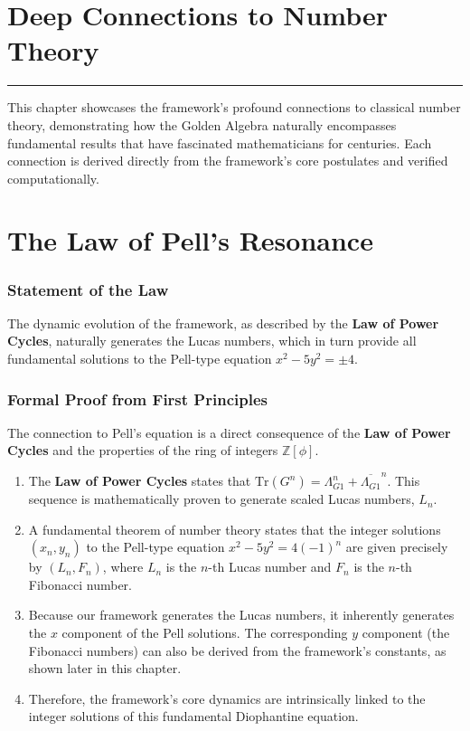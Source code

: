 
\section{Deep Connections to Number Theory}
\label{chap:number_theory}

\hrule
\vspace{1em}
This chapter showcases the framework's profound connections to classical number theory, demonstrating how the Golden Algebra naturally encompasses fundamental results that have fascinated mathematicians for centuries. Each connection is derived directly from the framework's core postulates and verified computationally.

\section{The Law of Pell's Resonance}

\subsubsection*{Statement of the Law}
The dynamic evolution of the framework, as described by the \textbf{Law of Power Cycles}, naturally generates the Lucas numbers, which in turn provide all fundamental solutions to the Pell-type equation $x^2 - 5y^2 = \pm 4$.

\subsubsection*{Formal Proof from First Principles}
The connection to Pell's equation is a direct consequence of the \textbf{Law of Power Cycles} and the properties of the ring of integers $\mathbb{Z}[\phi]$.
\begin{enumerate}
    \item The \textbf{Law of Power Cycles} states that $\text{Tr}(G^n) = \Lambda_{G1}^n + \overline{\Lambda_{G1}}^n$. This sequence is mathematically proven to generate scaled Lucas numbers, $L_n$.
    \item A fundamental theorem of number theory states that the integer solutions $(x_n, y_n)$ to the Pell-type equation $x^2 - 5y^2 = 4(-1)^n$ are given precisely by $(L_n, F_n)$, where $L_n$ is the $n$-th Lucas number and $F_n$ is the $n$-th Fibonacci number.
    \item Because our framework generates the Lucas numbers, it inherently generates the $x$ component of the Pell solutions. The corresponding $y$ component (the Fibonacci numbers) can also be derived from the framework's constants, as shown later in this chapter.
    \item Therefore, the framework's core dynamics are intrinsically linked to the integer solutions of this fundamental Diophantine equation.
\end{enumerate}


